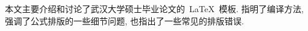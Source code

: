 

\begin{cnabstract}
本文主要介绍和讨论了武汉大学硕士毕业论文的~\LaTeX~模板.
指明了编译方法, 强调了公式排版的一些细节问题, 也指出了一些常见的排版错误.



\end{cnabstract}
\vspace{1em}\par\vfill













